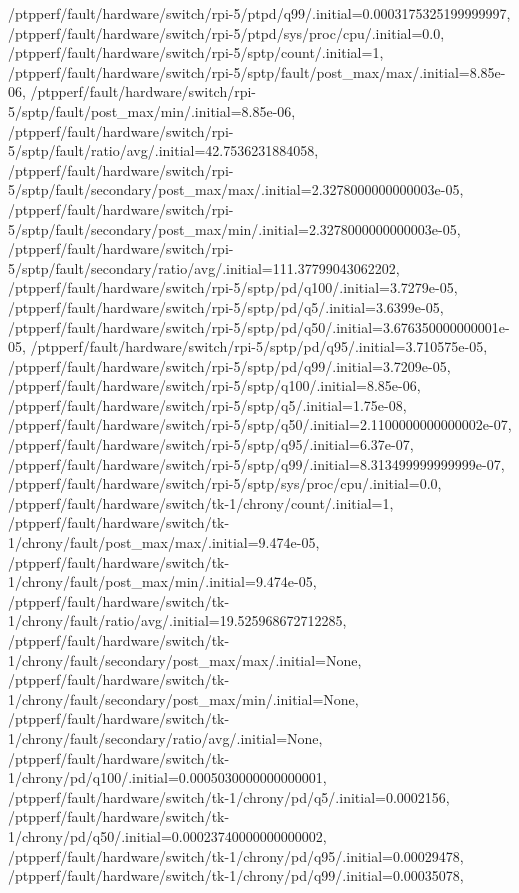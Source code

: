 {    /ptpperf/fault/hardware/switch/rpi-5/ptpd/q99/.initial=0.0003175325199999997,
    /ptpperf/fault/hardware/switch/rpi-5/ptpd/sys/proc/cpu/.initial=0.0,
    /ptpperf/fault/hardware/switch/rpi-5/sptp/count/.initial=1,
    /ptpperf/fault/hardware/switch/rpi-5/sptp/fault/post_max/max/.initial=8.85e-06,
    /ptpperf/fault/hardware/switch/rpi-5/sptp/fault/post_max/min/.initial=8.85e-06,
    /ptpperf/fault/hardware/switch/rpi-5/sptp/fault/ratio/avg/.initial=42.7536231884058,
    /ptpperf/fault/hardware/switch/rpi-5/sptp/fault/secondary/post_max/max/.initial=2.3278000000000003e-05,
    /ptpperf/fault/hardware/switch/rpi-5/sptp/fault/secondary/post_max/min/.initial=2.3278000000000003e-05,
    /ptpperf/fault/hardware/switch/rpi-5/sptp/fault/secondary/ratio/avg/.initial=111.37799043062202,
    /ptpperf/fault/hardware/switch/rpi-5/sptp/pd/q100/.initial=3.7279e-05,
    /ptpperf/fault/hardware/switch/rpi-5/sptp/pd/q5/.initial=3.6399e-05,
    /ptpperf/fault/hardware/switch/rpi-5/sptp/pd/q50/.initial=3.676350000000001e-05,
    /ptpperf/fault/hardware/switch/rpi-5/sptp/pd/q95/.initial=3.710575e-05,
    /ptpperf/fault/hardware/switch/rpi-5/sptp/pd/q99/.initial=3.7209e-05,
    /ptpperf/fault/hardware/switch/rpi-5/sptp/q100/.initial=8.85e-06,
    /ptpperf/fault/hardware/switch/rpi-5/sptp/q5/.initial=1.75e-08,
    /ptpperf/fault/hardware/switch/rpi-5/sptp/q50/.initial=2.1100000000000002e-07,
    /ptpperf/fault/hardware/switch/rpi-5/sptp/q95/.initial=6.37e-07,
    /ptpperf/fault/hardware/switch/rpi-5/sptp/q99/.initial=8.313499999999999e-07,
    /ptpperf/fault/hardware/switch/rpi-5/sptp/sys/proc/cpu/.initial=0.0,
    /ptpperf/fault/hardware/switch/tk-1/chrony/count/.initial=1,
    /ptpperf/fault/hardware/switch/tk-1/chrony/fault/post_max/max/.initial=9.474e-05,
    /ptpperf/fault/hardware/switch/tk-1/chrony/fault/post_max/min/.initial=9.474e-05,
    /ptpperf/fault/hardware/switch/tk-1/chrony/fault/ratio/avg/.initial=19.525968672712285,
    /ptpperf/fault/hardware/switch/tk-1/chrony/fault/secondary/post_max/max/.initial=None,
    /ptpperf/fault/hardware/switch/tk-1/chrony/fault/secondary/post_max/min/.initial=None,
    /ptpperf/fault/hardware/switch/tk-1/chrony/fault/secondary/ratio/avg/.initial=None,
    /ptpperf/fault/hardware/switch/tk-1/chrony/pd/q100/.initial=0.0005030000000000001,
    /ptpperf/fault/hardware/switch/tk-1/chrony/pd/q5/.initial=0.0002156,
    /ptpperf/fault/hardware/switch/tk-1/chrony/pd/q50/.initial=0.00023740000000000002,
    /ptpperf/fault/hardware/switch/tk-1/chrony/pd/q95/.initial=0.00029478,
    /ptpperf/fault/hardware/switch/tk-1/chrony/pd/q99/.initial=0.00035078,
}
